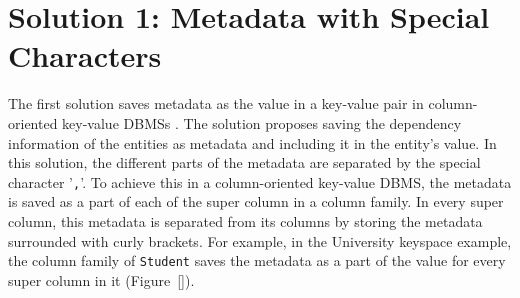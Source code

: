 % 		
% 		
		
	
\section{Solution 1:  Metadata with Special Characters}\label{s:sol1}

	
	The first solution saves
	metadata as the value in a key-value pair  in
	column-oriented key-value \acp{DBMS} .
	The solution proposes saving the dependency information of the entities as
	metadata and including it in the entity's value.  In this solution, the
	different parts of the metadata
	are separated by the special character '\texttt{,}'.
	To achieve this in a column-oriented key-value \ac{DBMS}, the metadata is saved
	as a part of each of the super column  in a column family.
	In every super column,  this metadata is separated from its columns
	 by storing the metadata surrounded with curly brackets. For example,  in the
	 University keyspace example,  the column family of \texttt{Student} saves
	 the metadata as a part of the value  for every  super
	 column in it (Figure~\ref{}).


